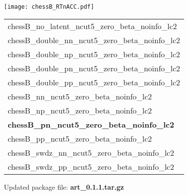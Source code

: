 \documentclass[letterpaper,11pt]{article}
\begin{document}
\begin{center}
\texttt{[image: chessB\_RTnACC.pdf]}
\end{center}
\begin{center}
\begin{tabular}{l}
chessB\_no\_latent\_ncut5\_zero\_beta\_noinfo\_lc2\\
chessB\_double\_nn\_ncut5\_zero\_beta\_noinfo\_lc2\\
chessB\_double\_np\_ncut5\_zero\_beta\_noinfo\_lc2\\
chessB\_double\_pn\_ncut5\_zero\_beta\_noinfo\_lc2\\
chessB\_double\_pp\_ncut5\_zero\_beta\_noinfo\_lc2\\
chessB\_nn\_ncut5\_zero\_beta\_noinfo\_lc2\\
chessB\_np\_ncut5\_zero\_beta\_noinfo\_lc2\\
\textbf{chessB\_pn\_ncut5\_zero\_beta\_noinfo\_lc2}\\
chessB\_pp\_ncut5\_zero\_beta\_noinfo\_lc2\\
chessB\_swdz\_nn\_ncut5\_zero\_beta\_noinfo\_lc2\\
chessB\_swdz\_pp\_ncut5\_zero\_beta\_noinfo\_lc2\\
\end{tabular}
\end{center}

Updated package file: \textbf{art\_0.1.1.tar.gz}
\end{document}
